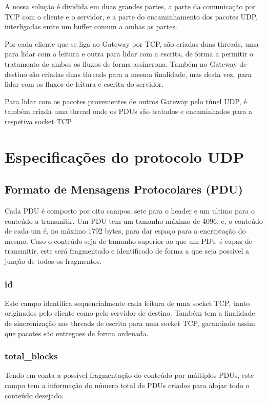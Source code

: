 \documentclass[a4paper]{report}
\begin{document}
A nossa solução é dividida em duas grandes partes, a parte da comunicação
por TCP com o cliente e o servidor, e a parte do encaminhamento dos pacotes
UDP, interligadas entre um buffer comum a ambas as partes.

Por cada cliente que se liga ao Gateway por TCP, são criadas duas threads, 
uma para lidar com a leitura e outra para lidar com a escrita, de forma
a permitir o tratamento de ambos os fluxos de forma assíncrona. Também no
Gateway de destino são criadas duas threads para a mesma finalidade, mas 
desta vez, para lidar com os fluxos de leitura e escrita do servidor.

Para lidar com os pacotes provenientes de outros Gateway pelo túnel UDP,
é também criada uma thread onde os PDUs são tratados e encaminhados
para a respetiva socket TCP.

\chapter{Especificações do protocolo UDP}
\section{Formato de Mensagens Protocolares (PDU)}

Cada PDU é composto por oito campos, sete para o header e um ultimo
para o conteúdo a transmitir. Um PDU tem um tamanho máximo de 4096,
e, o conteúdo de cada um é, no máximo 1792 bytes, para dar espaço
para a encriptação do mesmo. Caso o conteúdo seja de tamanho 
superior ao que um PDU é capaz de transmitir, este será fragmentado
e identificado de forma a que seja possível a junção de todos os
fragmentos.

\subsection{id}

Este campo identifica sequencialmente cada leitura de uma socket TCP,
tanto originados pelo cliente como pelo servidor de destino. Também 
tem a finalidade de sincronização nas threads de escrita para uma
socket TCP, garantindo assim que pacotes são entregues de forma ordenada.

\subsection{total\_blocks}

Tendo em conta a possível fragmentação do conteúdo por múltiplos PDUs,
este campo tem a informação do número total de PDUs criados para alojar
todo o conteúdo desejado.
\end{document}

